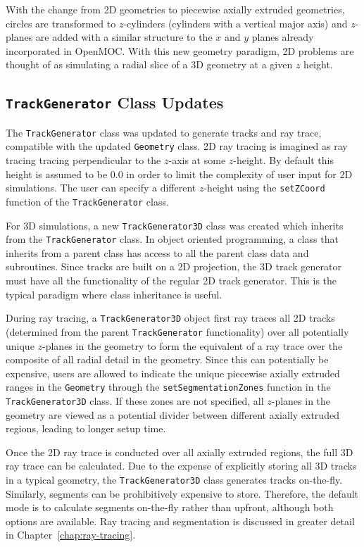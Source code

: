 With the change from 2D geometries to piecewise axially extruded geometries, circles are transformed to $z$-cylinders (cylinders with a vertical major axis) and $z$-planes are added with a similar structure to the $x$ and $y$ planes already incorporated in OpenMOC. With this new geometry paradigm, 2D problems are thought of as simulating a radial slice of a 3D geometry at a given $z$ height. 

\subsection{\texttt{TrackGenerator} Class Updates}
\label{sec:oo-trackgenerator}

The \texttt{TrackGenerator} class was updated to generate tracks and ray trace, compatible with the updated \texttt{Geometry} class. 2D ray tracing is imagined as ray tracing tracing perpendicular to the $z$-axis at some $z$-height. By default this height is assumed to be 0.0 in order to limit the complexity of user input for 2D simulations. The user can specify a different $z$-height using the \texttt{setZCoord} function of the \texttt{TrackGenerator} class.

For 3D simulations, a new \texttt{TrackGenerator3D} class was created which inherits from the \texttt{TrackGenerator} class. In object oriented programming, a class that inherits from a parent class has access to all the parent class data and subroutines. Since tracks are built on a 2D projection, the 3D track generator must have all the functionality of the regular 2D track generator. This is the typical paradigm where class inheritance is useful. 

During ray tracing, a \texttt{TrackGenerator3D} object first ray traces all 2D tracks (determined from the parent \texttt{TrackGenerator} functionality) over all potentially unique $z$-planes in the geometry to form the equivalent of a ray trace over the composite of all radial detail in the geometry. Since this can potentially be expensive, users are allowed to indicate the unique piecewise axially extruded ranges in the \texttt{Geometry} through the \texttt{setSegmentationZones} function in the \texttt{TrackGenerator3D} class. If these zones are not specified, all $z$-planes in the geometry are viewed as a potential divider between different axially extruded regions, leading to longer setup time.

Once the 2D ray trace is conducted over all axially extruded regions, the full 3D ray trace can be calculated. Due to the expense of explicitly storing all 3D tracks in a typical geometry, the \texttt{TrackGenerator3D} class generates tracks on-the-fly. Similarly, segments can be prohibitively expensive to store. Therefore, the default mode is to calculate segments on-the-fly rather than upfront, although both options are available. Ray tracing and segmentation is discussed in greater detail in Chapter~\ref{chap:ray-tracing}.

